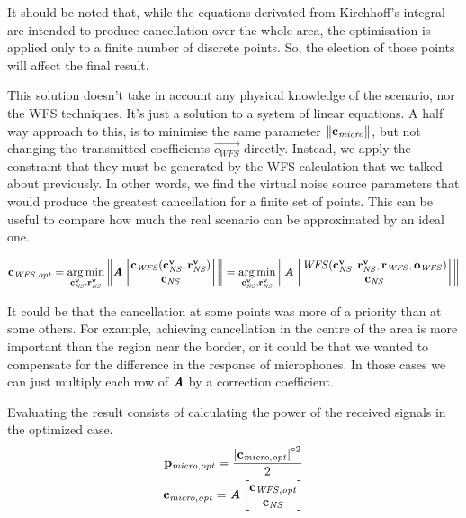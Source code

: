 It should be noted that, while the equations derivated from Kirchhoff's integral are intended to produce cancellation over the whole area, the optimisation is applied only to a finite number of discrete points. So, the election of those points will affect the final result.

This solution doesn't take in account any physical knowledge of the scenario, nor the WFS techniques. It's just a solution to a system of linear equations. A half way approach to this, is to minimise the same parameter $\left\| \mathbf{c_\mathit{micro}} \right\|$, but not changing the transmitted coefficients $\vec{c_{\mathit{WFS}}}$ directly. Instead, we apply the constraint that they must be generated by the WFS calculation that we talked about previously. In other words, we find the virtual noise source parameters that would produce the greatest cancellation for a finite set of points. This can be useful to compare how much the real scenario can be approximated by an ideal one.

\begin{equation}
\mathbf{c_{\mathit{WFS}, \mathit{opt}}} =
\operatorname*{arg\,min}_{\mathbf{c_\mathit{NS}^v}, \mathbf{r_{\mathit{NS}}^v}}
\left\| \bm{\mathit{A}}
	\begin{bmatrix}
	\mathbf{c_\mathit{WFS}}(\mathbf{c_\mathit{NS}^v}, \mathbf{r_{\mathit{NS}}^v})\\
	\mathbf{c_\mathit{NS}}\\
	\end{bmatrix}
 \right\| =
\operatorname*{arg\,min}_{\mathbf{c_\mathit{NS}^v}, \mathbf{r_{\mathit{NS}}^v}}
\left\| \bm{\mathit{A}}
	\begin{bmatrix}
	\mathit{WFS}(\mathbf{c_\mathit{NS}^v}, \mathbf{r_{\mathit{NS}}^v}, \mathbf{r}_\mathit{WFS}, \mathbf{o}_\mathit{WFS})\\
	\mathbf{c_\mathit{NS}}\\
	\end{bmatrix}
 \right\|
\end{equation}

It could be that the cancellation at some points was more of a priority than at some others. For example, achieving cancellation in the centre of the area is more important than the region near the border, or it could be that we wanted to compensate for the difference in the response of microphones. In those cases we can just multiply each row of $\bm{\mathit{A}}$ by a correction coefficient.

Evaluating the result consists of calculating the power of the received signals in the optimized case.
\begin{gather}
	\mathbf{p_\mathit{micro,opt}} = \frac{\left| \mathbf{c_{\mathit{micro,opt}}} \right|^{\circ 2}}{2}
	\\
	\mathbf{c_\mathit{\mathit{micro,opt}}} = \bm{\mathit{A}}
	\begin{bmatrix}
	\mathbf{c_\mathit{WFS,opt}} \\
	\mathbf{c_{\mathit{NS}}}
	\end{bmatrix}
\end{gather}

